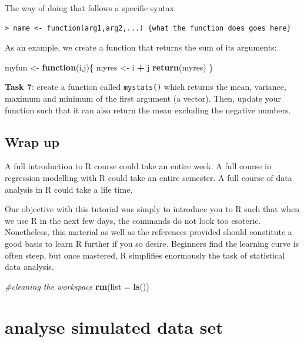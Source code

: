 \documentclass[]{book}
\newenvironment{Shaded}{\begin{snugshade}}{\end{snugshade}}
\newcommand{\KeywordTok}[1]{\textcolor[rgb]{0.13,0.29,0.53}{\textbf{#1}}}
\newcommand{\DataTypeTok}[1]{\textcolor[rgb]{0.13,0.29,0.53}{#1}}
\newcommand{\StringTok}[1]{\textcolor[rgb]{0.31,0.60,0.02}{#1}}
\newcommand{\CommentTok}[1]{\textcolor[rgb]{0.56,0.35,0.01}{\textit{#1}}}
\newcommand{\ControlFlowTok}[1]{\textcolor[rgb]{0.13,0.29,0.53}{\textbf{#1}}}
\newcommand{\OperatorTok}[1]{\textcolor[rgb]{0.81,0.36,0.00}{\textbf{#1}}}
\newcommand{\NormalTok}[1]{#1}
\theoremstyle{definition}
\theoremstyle{definition}
\theoremstyle{remark}
\begin{document}
The way of doing that follows a specific syntax

\begin{verbatim}
> name <- function(arg1,arg2,...) {what the function does goes here}
\end{verbatim}

As an example, we create a function that returns the sum of its
arguments:

\begin{Shaded}
\begin{Highlighting}[]
\NormalTok{myfun <-}\StringTok{ }\ControlFlowTok{function}\NormalTok{(i,j)\{}
\NormalTok{  myres <-}\StringTok{ }\NormalTok{i }\OperatorTok{+}\StringTok{ }\NormalTok{j}
  \KeywordTok{return}\NormalTok{(myres)}
\NormalTok{\}}
\end{Highlighting}
\end{Shaded}

\textbf{Task 7}: create a function called \texttt{mystats()} which
returns the mean, variance, maximum and minimum of the first argument (a
vector). Then, update your function such that it can also return the
mean excluding the negative numbers.

\section{Wrap up}\label{wrap-up}

A full introduction to R course could take an entire week. A full course
in regression modelling with R could take an entire semester. A full
course of data analysis in R could take a life time.

Our objective with this tutorial was simply to introduce you to R such
that when we use R in the next few days, the commands do not look too
esoteric. Nonetheless, this material as well as the references provided
should constitute a good basis to learn R further if you so desire.
Beginners find the learning curve is often steep, but once mastered, R
simplifies enormously the task of statistical data analysis.

\begin{Shaded}
\begin{Highlighting}[]
\CommentTok{#cleaning the workspace}
\KeywordTok{rm}\NormalTok{(}\DataTypeTok{list =} \KeywordTok{ls}\NormalTok{())}
\end{Highlighting}
\end{Shaded}

\chapter{analyse simulated data set}\label{analyse-simulated-data-set}
\end{document}
